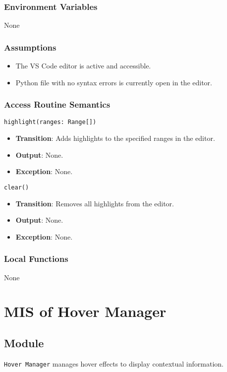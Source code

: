 \documentclass[12pt, titlepage]{article}
\begin{document}
\subsubsection{Environment Variables}
None


\subsubsection{Assumptions}
\begin{itemize}
\item The VS Code editor is active and accessible.
\item Python file with no syntax errors is currently open in the editor.
\end{itemize}

\subsubsection{Access Routine Semantics}
\texttt{highlight(ranges: Range[])}
\begin{itemize}
\item \textbf{Transition}: Adds highlights to the specified ranges in the editor.
\item \textbf{Output}: None.
\item \textbf{Exception}: None.
\end{itemize}

\texttt{clear()}
\begin{itemize}
\item \textbf{Transition}: Removes all highlights from the editor.
\item \textbf{Output}: None.
\item \textbf{Exception}: None.
\end{itemize}

\subsubsection{Local Functions}
None

\section{MIS of Hover Manager}

\subsection{Module}
\texttt{Hover Manager} manages hover effects to display contextual information.
\end{document}
